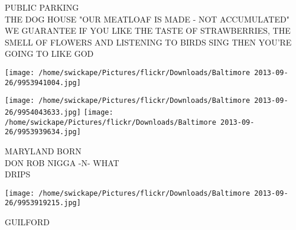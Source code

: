 \documentclass[10pt,letterpaper]{article}
\begin{document}
PUBLIC PARKING\\
THE DOG HOUSE "OUR MEATLOAF IS MADE {-} NOT ACCUMULATED"\\
WE GUARANTEE IF YOU LIKE THE TASTE OF STRAWBERRIES, THE SMELL OF FLOWERS AND LISTENING TO BIRDS SING THEN YOU'RE GOING TO LIKE GOD
\pagebreak

\texttt{[image: /home/swickape/Pictures/flickr/Downloads/Baltimore 2013-09-26/9953941004.jpg]}

\vspace{0.25in}
\texttt{[image: /home/swickape/Pictures/flickr/Downloads/Baltimore 2013-09-26/9954043633.jpg]}
\texttt{[image: /home/swickape/Pictures/flickr/Downloads/Baltimore 2013-09-26/9953939634.jpg]}

MARYLAND BORN\\
DON ROB NIGGA {-}N{-} WHAT\\
DRIPS
\pagebreak

\texttt{[image: /home/swickape/Pictures/flickr/Downloads/Baltimore 2013-09-26/9953919215.jpg]}

GUILFORD
\pagebreak
\end{document}
